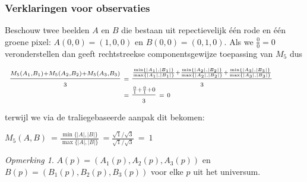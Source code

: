 \documentclass[dutch]{beamer}
\theoremstyle{definition}
\theoremstyle{remark}
\newtheorem{opmerking}[theorem]{Opmerking}
\theoremstyle{example}
\begin{document}
{
  \frametitle{Verklaringen voor observaties}
  
  Beschouw twee beelden $A$ en $B$ die bestaan uit repectievelijk
  \'e\'en {\color{red} rode} en \'e\'en {\color{green} groene} pixel: $A(0,0)=(1,0,0)$ en $B(0,0)=(0,1,0)$.
  Als we
  $\frac{0}{0} = 0$ veronderstellen dan geeft rechtstreekse componentsgewijze toepassing van 
  $M_5$ dus
  \begin{minipage}{\textwidth}
  \vspace{4pt}
  \centering
  $\begin{array}{r@{}l}
  \displaystyle\frac{\scriptstyle M_5(A_1,B_1)+M_5(A_2,B_2)+M_5(A_3,B_3)}{\scriptstyle 3} 
  & \scriptstyle\ = \displaystyle\frac{\scriptstyle \frac{\min\{|A_1|,|B_1|\}}{\max\{|A_1|,|B_1|\}}+\frac{\min\{|A_2|,|B_2|\}}{\max\{|A_2|,|B_2|\}}+\frac{\min\{|A_3|,|B_3|\}}{\max\{|A_3|,|B_3|\}}}{\scriptstyle 3} \\
  & \scriptstyle\ = \displaystyle\frac{\scriptstyle\frac{0}{1}+\frac{0}{1}+0}{\scriptstyle 3} \scriptstyle\ =\ 0
  \end{array}$
  \vspace{4pt}
  \end{minipage}
  terwijl we via de traliegebaseerde aanpak dit bekomen:
  \begin{minipage}{\textwidth}
  \vspace{4pt}
  \centering
  $\scriptstyle M_5(A,B)\ = \displaystyle \frac{\scriptstyle \min\{|A|,|B|\}}{\scriptstyle \max\{|A|,|B|\}} \scriptstyle\ = \displaystyle \frac{\scriptstyle \sqrt{1} / \sqrt{3}}{\scriptstyle \sqrt{1} / \sqrt{3}} \scriptstyle\ =\ 1$
  \end{minipage}
  \begin{opmerking}
  $A(p)=(A_1(p),A_2(p),A_3(p))$ en $B(p)=(B_1(p),B_2(p),B_3(p))$ voor elke $p$ uit het universum.
  \end{opmerking}
}
\frame
\end{document}

